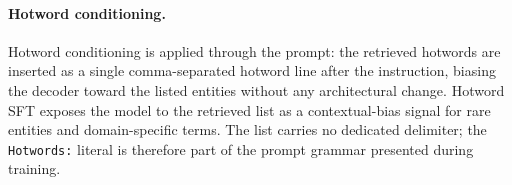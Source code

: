 \paragraph{Hotword conditioning.}
Hotword conditioning is applied through the prompt: the retrieved
hotwords are inserted as a single comma-separated hotword
line after the instruction, biasing the decoder toward the listed
entities without any architectural change. Hotword SFT exposes the
model to the retrieved list as a contextual-bias signal for rare
entities and domain-specific terms. The list carries no dedicated
delimiter; the \verb|Hotwords:| literal is therefore part of the
prompt grammar presented during training.

\FloatBarrier
